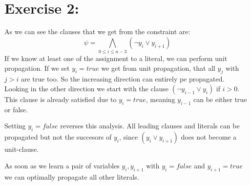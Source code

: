 \documentclass{base}
\begin{document}
\section*{Exercise 2:}
As we can see the clauses that we get from the constraint are:
	\begin{equation}
		\psi = \bigwedge\limits_{0\leq i \leq n-3} (\neg y_{i}\lor y_{i+1})
	\end{equation}
    If we know at least one of the assignment to a literal, we can perform unit propagation.
    If we set $y_i=true$ we get from unit propagation, that all $y_j$ with $j>i$ are true too. So the increasing direction can entirely pe propagated. Looking in the other direction we start with the clause $(\neg y_{i-1} \lor y_i)$ if $i>0$.
    This clause is already satisfied due to $y_i=true$, meaning $y_{i-1}$ can be either true or false.

Setting $y_i=false$ reverses this analysis. All leading clauses and literals can be propagated but not the succesors of $y_i$, since $(y_i \lor y_{i+1})$ does not become a unit-clause.
    
As soon as we learn a pair of variables $y_i, y_{i+1}$ with $y_i=false$ and $y_{i+1}=true$ we can optimally propagate all other literals.
\end{document}
